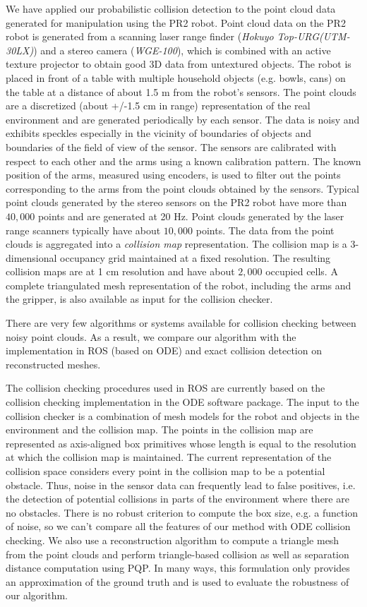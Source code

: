 We have applied our probabilistic collision detection to the point cloud data generated for manipulation using the PR2 robot. Point cloud data on the PR2 robot is generated from a scanning laser range finder (\emph{Hokuyo Top-URG(UTM-30LX)}) and a stereo camera (\emph{WGE-100}), which is combined with an active texture projector to obtain good 3D data from untextured objects. The robot is placed in front of a table with multiple household objects (e.g. bowls, cans) on the table at a distance of about 1.5 m from the robot's sensors. The point clouds are a discretized (about +/-1.5 cm in range) representation of the real environment and are generated periodically by each sensor. The data is noisy and exhibits speckles especially in the vicinity of boundaries of objects and boundaries of the field of view of the sensor. The sensors are calibrated with respect to each other and the arms using a known calibration pattern. The known position of the arms, measured using encoders, is used to filter out the points corresponding to the arms from the point clouds obtained by the sensors. Typical point clouds generated by the stereo sensors on the PR2 robot have more than $40,000$ points and are generated at 20 Hz. Point clouds generated by the laser range scanners typically have about $10,000$ points. The data from the point clouds is aggregated into a {\em collision map} representation. The collision map is a 3-dimensional occupancy grid maintained at a fixed resolution. The resulting collision maps are at 1 cm resolution and have about $2,000$ occupied cells. A complete triangulated mesh representation of the robot, including the arms and the gripper, is also available as input for the collision checker.

There are very few algorithms or systems available for collision checking between noisy point clouds. As a result, we compare our algorithm with the implementation in ROS (based on ODE) and exact collision detection on reconstructed meshes.

The collision checking procedures used in ROS are currently based on the collision checking implementation in the ODE software package. The input to the collision checker is a combination of mesh models for the robot and objects in the environment and the collision map. The points in the collision map are represented as axis-aligned box primitives whose length is equal to the resolution at which the collision map is maintained. The current representation of the collision space considers every point in the collision map to be a potential obstacle. Thus, noise in the sensor data can frequently lead to false positives, i.e. the detection of potential collisions in parts of the environment where there are no obstacles. There is no robust criterion to compute the box size, e.g. a function of noise, so we can't compare all the features of our method with ODE collision checking. We also use a reconstruction algorithm to compute a triangle mesh from the point clouds and perform triangle-based collision as well as separation distance computation using PQP. In many ways, this formulation only provides an approximation of the ground truth and is used to evaluate the robustness of our algorithm.


